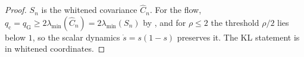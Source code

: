 \begin{proof}
$S_n$ is the whitened covariance $\widehat C_n$. For the flow,
$q_{\mathrm c}=q_{\mathrm G}\geq2\lambda_{\min}(\widehat C_n)=2\lambda_{\min}(S_n)$ by
, and for $\rho\leq2$ the threshold $\rho/2$ lies below $1$, so the scalar
dynamics $\dot s=s(1-s)$ preserves it. The KL statement is  in whitened
coordinates.
\end{proof}

